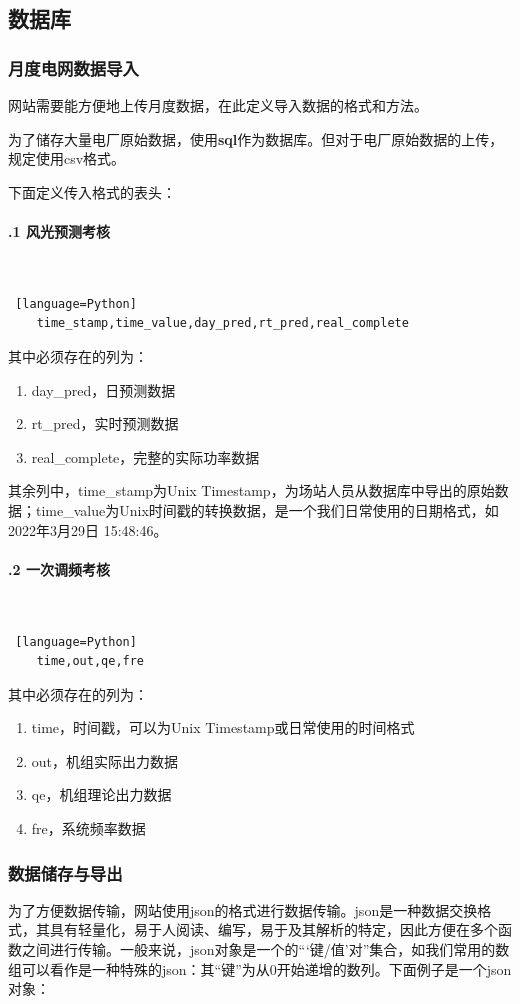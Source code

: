 \documentclass[winfonts,UTF8,a4paper]{ctexart}
\begin{document}
\subsection{数据库}
\subsubsection{月度电网数据导入}
网站需要能方便地上传月度数据，在此定义导入数据的格式和方法。

为了储存大量电厂原始数据，使用\textbf{sql}作为数据库。但对于电厂原始数据的上传，规定使用csv格式。

下面定义传入格式的表头：
\paragraph{\thesubsubsection.1 风光预测考核}\ \\
\begin{lstlisting} [language=Python]
	time_stamp,time_value,day_pred,rt_pred,real_complete
\end{lstlisting}
其中必须存在的列为：
\begin{enumerate}
	\item day\_pred，日预测数据
	\item rt\_pred，实时预测数据
	\item real\_complete，完整的实际功率数据
\end{enumerate}

其余列中，time\_stamp为Unix Timestamp，为场站人员从数据库中导出的原始数据；time\_value为Unix时间戳的转换数据，是一个我们日常使用的日期格式，如2022年3月29日 15:48:46。

\paragraph{\thesubsubsection.2 一次调频考核}\ \\
\begin{lstlisting} [language=Python]
	time,out,qe,fre
\end{lstlisting}
其中必须存在的列为：
\begin{enumerate}
	\item time，时间戳，可以为Unix Timestamp或日常使用的时间格式
	\item out，机组实际出力数据
	\item qe，机组理论出力数据
	\item fre，系统频率数据
\end{enumerate}

\subsubsection{数据储存与导出}
为了方便数据传输，网站使用json的格式进行数据传输。json是一种数据交换格式，其具有轻量化，易于人阅读、编写，易于及其解析的特定，因此方便在多个函数之间进行传输。一般来说，json对象是一个的“‘键/值’对”集合，如我们常用的数组可以看作是一种特殊的json：其“键”为从0开始递增的数列。下面例子是一个json对象：
\end{document}

